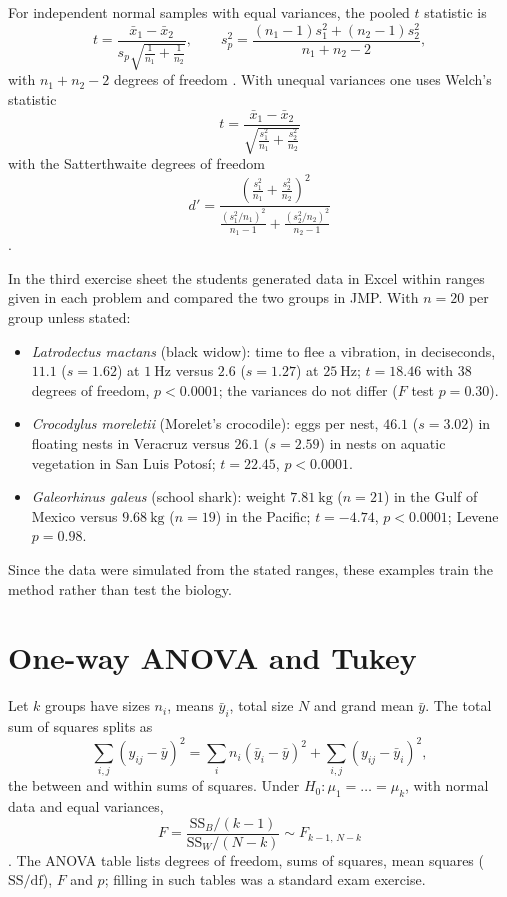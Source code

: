 For independent normal samples with
equal variances, the pooled $t$
statistic is
$$
t = \frac{\bar{x}_1 - \bar{x}_2}
{s_p\sqrt{\frac{1}{n_1}+\frac{1}{n_2}}},
\qquad
s_p^2 = \frac{(n_1-1)s_1^2
+ (n_2-1)s_2^2}{n_1+n_2-2},
$$
with $n_1 + n_2 - 2$ degrees of freedom
\cite[Section
8.4]{rosner2011biostatistics}.
With unequal variances one uses Welch's
statistic
$$
t = \frac{\bar{x}_1 - \bar{x}_2}
{\sqrt{\frac{s_1^2}{n_1}
+ \frac{s_2^2}{n_2}}}
$$
with the Satterthwaite degrees of freedom
$$
d' = \frac{\left(\frac{s_1^2}{n_1}
+ \frac{s_2^2}{n_2}\right)^2}
{\frac{(s_1^2/n_1)^2}{n_1-1}
+ \frac{(s_2^2/n_2)^2}{n_2-1}}
$$
\cite[Section
8.7]{rosner2011biostatistics}.

\begin{example}
\label{example-two-samples}
In the third exercise sheet the students
generated data in Excel within ranges
given in each problem and compared the
two groups in JMP. With $n = 20$ per
group unless stated:
\begin{itemize}
\item \emph{Latrodectus mactans} (black
widow): time to flee a vibration, in
deciseconds, $11.1$ ($s = 1.62$) at
$1\ \mathrm{Hz}$ versus $2.6$
($s = 1.27$) at $25\ \mathrm{Hz}$;
$t = 18.46$ with $38$ degrees of
freedom, $p < 0.0001$; the variances do
not differ ($F$ test $p = 0.30$).
\item \emph{Crocodylus moreletii}
(Morelet's crocodile): eggs per nest,
$46.1$ ($s = 3.02$) in floating nests in
Veracruz versus $26.1$ ($s = 2.59$) in
nests on aquatic vegetation in San Luis
Potos\'i; $t = 22.45$, $p < 0.0001$.
\item \emph{Galeorhinus galeus} (school
shark): weight $7.81\ \mathrm{kg}$
($n = 21$) in the Gulf of Mexico versus
$9.68\ \mathrm{kg}$ ($n = 19$) in the
Pacific; $t = -4.74$, $p < 0.0001$;
Levene $p = 0.98$.
\end{itemize}
Since the data were simulated from the
stated ranges, these examples train the
method rather than test the biology.
\end{example}

\section{One-way ANOVA and Tukey}
\label{section-anova}

Let $k$ groups have sizes $n_i$, means
$\bar{y}_i$, total size $N$ and grand
mean $\bar{y}$. The total sum of squares
splits as
$$
\sum_{i,j}(y_{ij} - \bar{y})^2
= \sum_i n_i(\bar{y}_i - \bar{y})^2
+ \sum_{i,j}(y_{ij} - \bar{y}_i)^2,
$$
the between and within sums of squares.
Under $H_0\colon \mu_1 = \dots = \mu_k$,
with normal data and equal variances,
$$
F = \frac{\mathrm{SS}_B/(k-1)}
{\mathrm{SS}_W/(N-k)}
\sim F_{k-1,\,N-k}
$$
\cite[Sections
12.2--12.3]{rosner2011biostatistics}.
The ANOVA table lists degrees of freedom,
sums of squares, mean squares
($\mathrm{SS}/\mathrm{df}$), $F$ and $p$;
filling in such tables was a standard
exam exercise.

